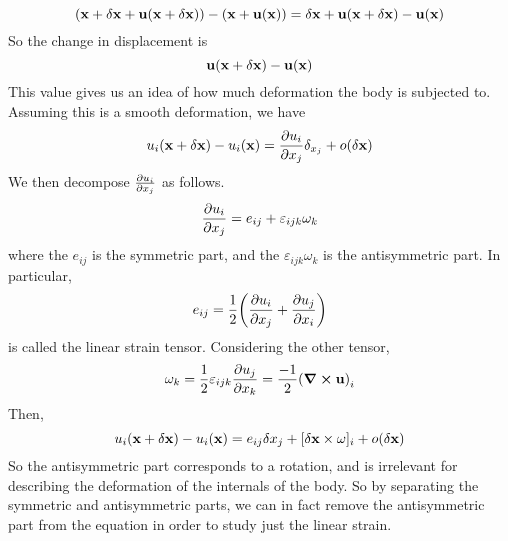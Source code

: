 \[ (\vb x + \delta \vb x + \vb u(\vb x + \delta\vb x)) - (\vb x + \vb u(\vb x)) = \delta \vb x + \vb u(\vb x + \delta\vb x) - \vb u(\vb x) \]
So the change in displacement is
\[ \vb u(\vb x + \delta\vb x) - \vb u(\vb x) \]
This value gives us an idea of how much deformation the body is subjected to. Assuming this is a smooth deformation, we have
\[ u_i(\vb x + \delta\vb x) - u_i(\vb x) = \pdv{u_i}{x_j}\delta_{x_j} + o(\delta \vb x) \]
We then decompose \(\pdv{u_i}{x_j}\) as follows.
\[ \pdv{u_i}{x_j} = e_{ij} + \varepsilon_{ijk}\omega_k \]
where the \(e_{ij}\) is the symmetric part, and the \(\varepsilon_{ijk}\omega_k\) is the antisymmetric part. In particular,
\[ e_{ij} = \frac{1}{2}\qty(\pdv{u_i}{x_j} + \pdv{u_j}{x_i}) \]
is called the linear strain tensor. Considering the other tensor,
\[ \omega_k = \frac{1}{2}\varepsilon_{ijk}\pdv{u_j}{x_k} = \frac{-1}{2}\qty(\curl{\vb u})_i \]
Then,
\[ u_i(\vb x + \delta \vb x) - u_i(\vb x) = e_{ij} \delta x_j + [\delta \vb x \times \vb \omega]_i + o(\delta \vb x) \]
So the antisymmetric part corresponds to a rotation, and is irrelevant for describing the deformation of the internals of the body. So by separating the symmetric and antisymmetric parts, we can in fact remove the antisymmetric part from the equation in order to study just the linear strain.

